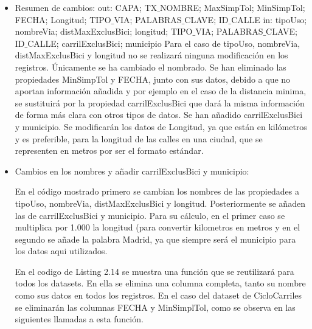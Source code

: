 \begin{itemize}
	\item Resumen de cambios:
	\newline out: CAPA; TX$\_$NOMBRE; MaxSimpTol; MinSimpTol; FECHA; Longitud; TIPO$\_$VIA; PALABRAS$\_$CLAVE; ID$\_$CALLE
	\newline in: tipoUso; nombreVia; distMaxExclusBici; longitud; TIPO$\_$VIA; PALABRAS$\_$CLAVE; ID$\_$CALLE; carrilExclusBici; municipio
	\newline
    \newline Para el caso de tipoUso, nombreVia, distMaxExclusBici y longitud no se realizará ninguna modificación en los registros. Únicamente se ha cambiado el nombrado.
    \newline Se han eliminado las propiedades MinSimpTol y FECHA, junto con sus datos, debido a que no aportan información añadida y por ejemplo en el caso de la distancia minima, se sustituirá por la propiedad carrilExclusBici que dará la misma información de forma más clara con otros tipos de datos.
    \newline Se han añadido carrilExclusBici y municipio.
    \newline Se modificarán los datos de Longitud, ya que están en kilómetros y es preferible, para la longitud de las calles en una ciudad, que se representen en metros por ser el formato estándar.
    \newline
    
    \item Cambios en los nombres y añadir carrilExclusBici y municipio:
    
    

En el código mostrado primero se cambian los nombres de las propiedades a tipoUso, nombreVia, distMaxExclusBici y longitud. Posteriormente se añaden las de carrilExclusBici y municipio. Para su cálculo, en el primer caso se multiplica por 1.000 la longitud (para convertir kilometros en metros y en el segundo se añade la palabra Madrid, ya que siempre será el municipio para los datos aqui utilizados.
\newline

    
    
    En el codigo de Listing 2.14 se muestra una función que se reutilizará para todos los datasets. En ella se elimina una columna completa, tanto su nombre como sus datos en todos los registros.
\newline En el caso del dataset de CicloCarriles se eliminarán las columnas FECHA y MinSimplTol, como se observa en las siguientes llamadas a esta función.
    

\end{itemize}

